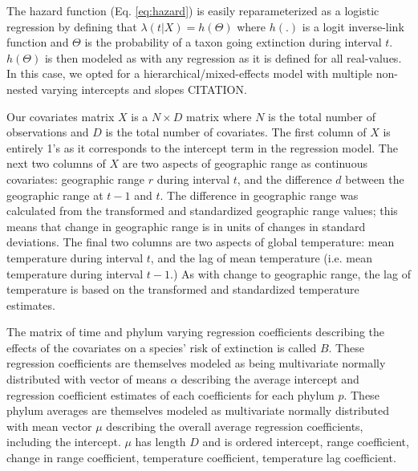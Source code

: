 \documentclass[12pt,letterpaper]{article}
\begin{document}
The hazard function (Eq. \ref{eq:hazard}) is easily reparameterized as a logistic regression by defining that \(\lambda(t | X) = h(\Theta)\) where \(h(.)\) is a logit inverse-link function and \(\Theta\) is the probability of a taxon going extinction during interval \(t\). \(h(\Theta)\) is then modeled as with any regression as it is defined for all real-values. In this case, we opted for a hierarchical/mixed-effects model with multiple non-nested varying intercepts and slopes CITATION. 

Our covariates matrix \(X\) is a \(N \times D\) matrix where \(N\) is the total number of observations and \(D\) is the total number of covariates. The first column of \(X\) is entirely 1's as it corresponds to the intercept term in the regression model. The next two columns of \(X\) are two aspects of geographic range as continuous covariates: geographic range \(r\) during interval \(t\), and the difference \(d\) between the geographic range at \(t - 1\) and \(t\). The difference in geographic range was calculated from the transformed and standardized geographic range values; this means that change in geographic range is in units of changes in standard deviations. The final two columns are two aspects of global temperature: mean temperature during interval \(t\), and the lag of mean temperature (i.e. mean temperature during interval \(t - 1\).) As with change to geographic range, the lag of temperature is based on the transformed and standardized temperature estimates. 

The matrix of time and phylum varying regression coefficients describing the effects of the covariates on a species' risk of extinction is called \(B\). These regression coefficients are themselves modeled as being multivariate normally distributed with vector of means \(\alpha\) describing the average intercept and regression coefficient estimates of each coefficients for each phylum \(p\). These phylum averages are themselves modeled as multivariate normally distributed with mean vector \(\mu\) describing the overall average regression coefficients, including the intercept. \(\mu\) has length \(D\) and is ordered intercept, range coefficient, change in range coefficient, temperature coefficient, temperature lag coefficient.
\end{document}
